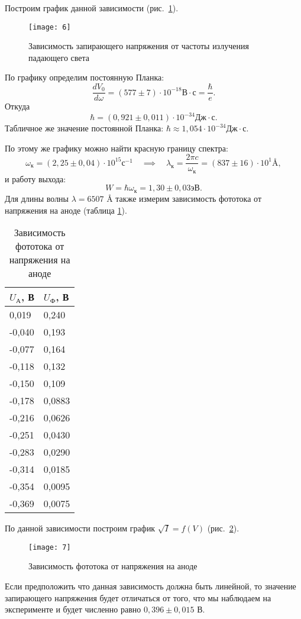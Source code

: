 \documentclass[a4paper]{article}
\begin{document}
Построим график данной зависимости (рис.~\ref{fig:6}).
\begin{figure}[h]
	\centering
	\texttt{[image: 6]}
	\caption{Зависимость запирающего напряжения от частоты
	излучения падающего света}
	\label{fig:6}
\end{figure}
По графику определим постоянную Планка:
\begin{equation}
	\frac{dV_0}{d\omega}=(577\pm 7)\cdot 10^{-18} \text{В}\cdot
	\text{с}=
\frac{\hbar}{e}
.\end{equation}
Откуда
\begin{equation}
\hbar=(0,921\pm 0,011)
	\cdot 10^{-34} \text{Дж}\cdot \text{с}
.\end{equation}
Табличное же значение постоянной Планка: $\hbar\approx 1,054 \cdot 10^{-34}
 \text{Дж}\cdot \text{с}$.

По этому же графику можно найти красную границу спектра:
\begin{equation}
	\omega_{\text{к}}=(2,25 \pm 0,04)\cdot 10^{15} \text{с}^{-1}\quad
	\implies \quad \lambda_{\text{к}}=\frac{2 \pi c}{\omega
	_{\text{к}}}=(837 \pm 16) \cdot 10^1 \text{\AA}
,\end{equation}
и работу выхода:
\begin{equation}
	W=\hbar \omega_{\text{к}}=1,30\pm 0,03 \text{эВ}
.\end{equation}
Для длины волны $\lambda=6507 \text{ \AA}$ также измерим зависимость
фототока от напряжения на аноде (таблица \ref{tab:3}).
\begin{table}[h]
\begin{tabular}{|l|l|}
\hline
$U_{\text{А}}$, В      & $U_{\text{Ф}}$,  В     \\ \hline
0,019  & 0,240  \\ \hline
-0,040 & 0,193  \\ \hline
-0,077 & 0,164  \\ \hline
-0,118 & 0,132  \\ \hline
-0,150 & 0,109  \\ \hline
-0,178 & 0,0883 \\ \hline
-0,216 & 0,0626 \\ \hline
-0,251 & 0,0430 \\ \hline
-0,283 & 0,0290 \\ \hline
-0,314 & 0,0185 \\ \hline
-0,354 & 0,0095 \\ \hline
-0,369 & 0,0075 \\ \hline
\end{tabular}
\caption{Зависимость фототока от напряжения на аноде}
\label{tab:3}
\end{table} 
По данной зависимости построим график $\sqrt{I} =f(V)$ (рис.~\ref{fig:7}).
\begin{figure}[h]
	\centering
	\texttt{[image: 7]}
	\caption{Зависимость фототока от напряжения на аноде}
	\label{fig:7}
\end{figure}
Если предположить что данная зависимость должна быть линейной,
то значение запирающего напряжения будет отличаться от того, что
мы наблюдаем на эксперименте и будет численно равно $0,396\pm 0,015$
В.
\end{document}
